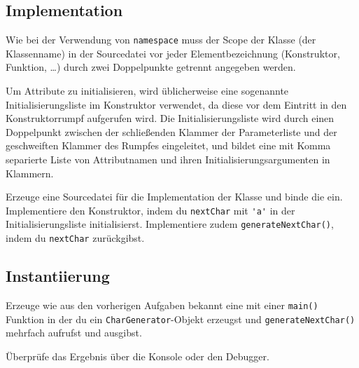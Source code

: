 \subsection{Implementation}
Wie bei der Verwendung von \lstinline{namespace} muss der Scope der Klasse (der Klassenname) in der Sourcedatei vor jeder Elementbezeichnung (Konstruktor, Funktion, \dots) durch zwei Doppelpunkte getrennt angegeben werden.

  

Um Attribute zu initialisieren, wird üblicherweise eine sogenannte Initialisierungsliste im Konstruktor verwendet, da diese vor dem Eintritt in den Konstruktorrumpf aufgerufen wird.
Die Initialisierungsliste wird durch einen Doppelpunkt zwischen der schließenden Klammer der Parameterliste und der geschweiften Klammer des Rumpfes eingeleitet, und bildet eine mit Komma separierte Liste von Attributnamen und ihren Initialisierungsargumenten in Klammern.

  

Erzeuge eine Sourcedatei  für die Implementation der Klasse und binde die  ein.
Implementiere den Konstruktor, indem du \lstinline{nextChar} mit \lstinline{'a'} in der Initialisierungsliste initialisierst.
Implementiere zudem \lstinline{generateNextChar()}, indem du \lstinline{nextChar} zurückgibst.


\subsection{Instantiierung}
Erzeuge wie aus den vorherigen Aufgaben bekannt eine  mit einer \lstinline{main()} Funktion in der du ein \lstinline{CharGenerator}-Objekt erzeugst und \lstinline{generateNextChar()} mehrfach aufrufst und ausgibst.

  

Überprüfe das Ergebnis über die Konsole oder den Debugger.


